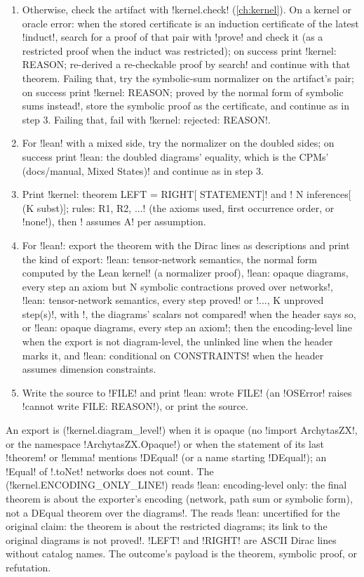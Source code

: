 \begin{algorithm}
\begin{enumerate}
\item Otherwise, check the artifact with \py!kernel.check! (\cref{ch:kernel}). On a kernel or oracle error: when the stored certificate is an induction certificate of the latest \azx!induct!, search for a proof of that pair with \py!prove! and check it (as a restricted proof when the induct was restricted); on success print \code!kernel: REASON; re-derived a re-checkable proof by search! and continue with that theorem. Failing that, try the symbolic-sum normalizer on the artifact's pair; on success print \code!kernel: REASON; proved by the normal form of symbolic sums instead!, store the symbolic proof as the certificate, and continue as in step 3. Failing that, fail with \code!kernel: rejected: REASON!.
\item For \code!lean! with a mixed side, try the normalizer on the doubled sides; on success print \code!lean: the doubled diagrams' equality, which is the CPMs' (docs/manual, Mixed States)! and continue as in step 3.
\item Print \code!kernel: theorem LEFT = RIGHT[ STATEMENT]! and \code!  N inferences[ (K subst)]; rules: R1, R2, ...! (the axioms used, first occurrence order, or \code!none!), then \code!  assumes A! per assumption.
\item For \code!lean!: export the theorem with the Dirac lines as descriptions and print the kind of export: \code!lean: tensor-network semantics, the normal form computed by the Lean kernel! (a normalizer proof), \code!lean: opaque diagrams, every step an axiom but N symbolic contractions proved over networks!, \code!lean: tensor-network semantics, every step proved! or \code!..., K unproved step(s)!, with \code!, the diagrams' scalars not compared! when the header says so, or \code!lean: opaque diagrams, every step an axiom!; then the encoding-level line when the export is not diagram-level, the unlinked line when the header marks it, and \code!lean: conditional on CONSTRAINTS! when the header assumes dimension constraints.
\item Write the source to \code!FILE! and print \code!lean: wrote FILE! (an \py!OSError! raises \code!cannot write FILE: REASON!), or print the source.
\end{enumerate}
An export is  (\py!kernel.diagram_level!) when it is opaque (no \code!import ArchytasZX!, or the namespace \code!ArchytasZX.Opaque!) or when the statement of its last \code!theorem! or \code!lemma! mentions \code!DEqual! (or a name starting \code!DEqual!); an \code!Equal! of \code!.toNet! networks does not count. The  (\py!kernel.ENCODING_ONLY_LINE!) reads \code!lean: encoding-level only: the final theorem is about the exporter's encoding (network, path sum or symbolic form), not a DEqual theorem over the diagrams!. The  reads \code!lean: uncertified for the original claim: the theorem is about the restricted diagrams; its link to the original diagrams is not proved!. \code!LEFT! and \code!RIGHT! are ASCII Dirac lines without catalog names. The outcome's payload is the theorem, symbolic proof, or refutation.
\end{algorithm}

